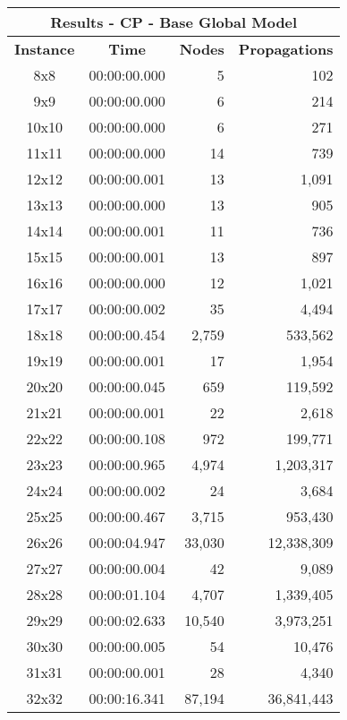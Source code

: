 
\begin{center}
    \begin{tabular}{|c|c|r|r|}
        \hline
        \multicolumn{4}{|c|}{\textbf{Results - CP - Base Global Model}} \\
        \hline
        \textbf{Instance} & \textbf{Time} & \textbf{Nodes} & \textbf{Propagations} \\
        
        \hline
		8x8 & 00:00:00.000 & 5 & 102 \\ \hline
		9x9 & 00:00:00.000 & 6 & 214 \\ \hline
		10x10 & 00:00:00.000 & 6 & 271 \\ \hline
		11x11 & 00:00:00.000 & 14 & 739 \\ \hline
		12x12 & 00:00:00.001 & 13 & 1,091 \\ \hline
		13x13 & 00:00:00.000 & 13 & 905 \\ \hline
		14x14 & 00:00:00.001 & 11 & 736 \\ \hline
		15x15 & 00:00:00.001 & 13 & 897 \\ \hline
		16x16 & 00:00:00.000 & 12 & 1,021 \\ \hline
		17x17 & 00:00:00.002 & 35 & 4,494 \\ \hline
		18x18 & 00:00:00.454 & 2,759 & 533,562 \\ \hline
		19x19 & 00:00:00.001 & 17 & 1,954 \\ \hline
		20x20 & 00:00:00.045 & 659 & 119,592 \\ \hline
		21x21 & 00:00:00.001 & 22 & 2,618 \\ \hline
		22x22 & 00:00:00.108 & 972 & 199,771 \\ \hline
		23x23 & 00:00:00.965 & 4,974 & 1,203,317 \\ \hline
		24x24 & 00:00:00.002 & 24 & 3,684 \\ \hline
		25x25 & 00:00:00.467 & 3,715 & 953,430 \\ \hline
		26x26 & 00:00:04.947 & 33,030 & 12,338,309 \\ \hline
		27x27 & 00:00:00.004 & 42 & 9,089 \\ \hline
		28x28 & 00:00:01.104 & 4,707 & 1,339,405 \\ \hline
		29x29 & 00:00:02.633 & 10,540 & 3,973,251 \\ \hline
		30x30 & 00:00:00.005 & 54 & 10,476 \\ \hline
		31x31 & 00:00:00.001 & 28 & 4,340 \\ \hline
		32x32 & 00:00:16.341 & 87,194 & 36,841,443 \\ \hline

\end{tabular}
\end{center}
